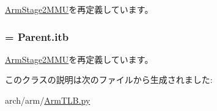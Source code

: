 \hyperlink{classArmTLB_1_1ArmStage2MMU_a9909fd406bc2a10a29e8593c7fccf8b4}{ArmStage2MMU}を再定義しています。\hypertarget{classArmTLB_1_1ArmStage2IMMU_aca6615da7b6b14e4b80293f21e77790c}{
\subsubsection[{tlb}]{ = Parent.itb}}
\label{classArmTLB_1_1ArmStage2IMMU_aca6615da7b6b14e4b80293f21e77790c}


\hyperlink{classArmTLB_1_1ArmStage2MMU_abccbff0f41ec90da875f4c4782845f8c}{ArmStage2MMU}を再定義しています。

このクラスの説明は次のファイルから生成されました:\begin{DoxyCompactItemize}
\item 
arch/arm/\hyperlink{ArmTLB_8py}{ArmTLB.py}\end{DoxyCompactItemize}

